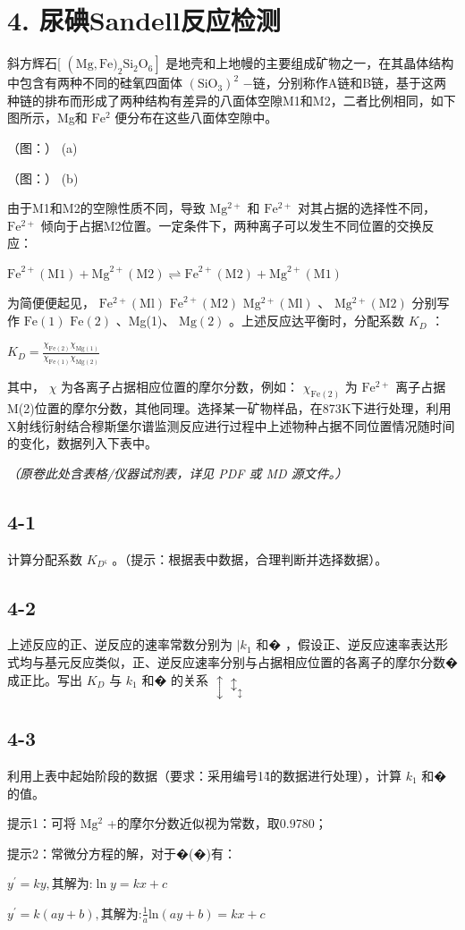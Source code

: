\section*{4. 尿碘Sandell反应检测}
斜⽅辉⽯[ $\left( \mathrm { M g , F e ) _ { 2 } S i _ { 2 } O _ { 6 } } \right]$ 是地壳和上地幔的主要组成矿物之⼀，在其晶体结构中包含有两种不同的硅氧四⾯体 $( \mathrm { S i O _ { 3 } } ) ^ { 2 }$ −链，分别称作A链和B链，基于这两种链的排布⽽形成了两种结构有差异的⼋⾯体空隙M1和M2，⼆者⽐例相同，如下图所⽰，Mg和 $\mathrm { F e ^ { 2 } }$ 便分布在这些⼋⾯体空隙中。

（图：）
(a)

（图：）
(b)

由于M1和M2的空隙性质不同，导致 $\mathrm { M g ^ { 2 + } }$ 和 $\mathrm { F e ^ { 2 + } }$ 对其占据的选择性不同， $\mathrm { F e ^ { 2 + } }$ 倾向于占据M2位置。⼀定条件下，两种离⼦可以发⽣不同位置的交换反应：

$
\mathrm{Fe} ^ {2 +} (\mathrm{M} 1) + \mathrm{Mg} ^ {2 +} (\mathrm{M} 2) \rightleftharpoons \mathrm{Fe} ^ {2 +} (\mathrm{M} 2) + \mathrm{Mg} ^ {2 +} (\mathrm{M} 1)
$

为简便便起⻅， $\mathrm { F e ^ { 2 + } ( M l ) }$ $\mathrm { F e } ^ { 2 + } ( \mathrm { M } 2 )$ $\mathrm { M g ^ { 2 + } ( M l ) }$ 、 $\mathrm { M g ^ { 2 + } ( M 2 ) }$ 分别写作 ${ \mathrm { F e } } ( 1 )$ ${ \mathrm { F e } } ( 2 )$ 、Mg(1)、 $\mathrm { M g } ( 2 )$ 。上述反应达平衡时，分配系数 $K _ { D }$ ：

$
K _ {D} = \frac {\chi_ {\mathrm{Fe(2)}} \chi_ {\mathrm{Mg(1)}}}{\chi_ {\mathrm{Fe(1)}} \chi_ {\mathrm{Mg(2)}}}
$

其中， $\chi$ 为各离⼦占据相应位置的摩尔分数，例如： $\chi _ { \mathrm { F e } ( 2 ) }$ 为 $\mathrm { F e ^ { 2 + } }$ 离⼦占据M(2)位置的摩尔分数，其他同理。选择某⼀矿物样品，在873K下进⾏处理，利⽤X射线衍射结合穆斯堡尔谱监测反应进⾏过程中上述物种占据不同位置情况随时间的变化，数据列⼊下表中。

\textit{（原卷此处含表格/仪器试剂表，详见 PDF 或 MD 源文件。）}

\subsection*{4-1}
计算分配系数 $K _ { D ^ { \varsigma } }$ 。（提⽰：根据表中数据，合理判断并选择数据）。

\subsection*{4-2}
上述反应的正、逆反应的速率常数分别为 $| k _ { 1 }$ 和� ，假设正、逆反应速率表达形式均与基元反应类似，正、逆反应速率分别与占据相应位置的各离⼦的摩尔分数�成正⽐。写出 $K _ { D }$ 与 $k _ { 1 }$ 和� 的关系 $\updownarrow \updownarrow _ { \updownarrow }$

\subsection*{4-3}
利⽤上表中起始阶段的数据（要求：采⽤编号1\~4的数据进⾏处理），计算 $k _ { 1 }$ 和� 的值。

提⽰1：可将 $\mathrm { M g ^ { 2 } }$ +的摩尔分数近似视为常数，取0.9780；

提⽰2：常微分⽅程的解，对于�(�)有：

$
y ^ {\prime} = k y, \text {其解为:} \ln y = k x + c
$

$
y ^ {\prime} = k (a y + b), \text {其解为:} \frac {1}{a} \mathrm{ln} (a y + b) = k x + c
$

